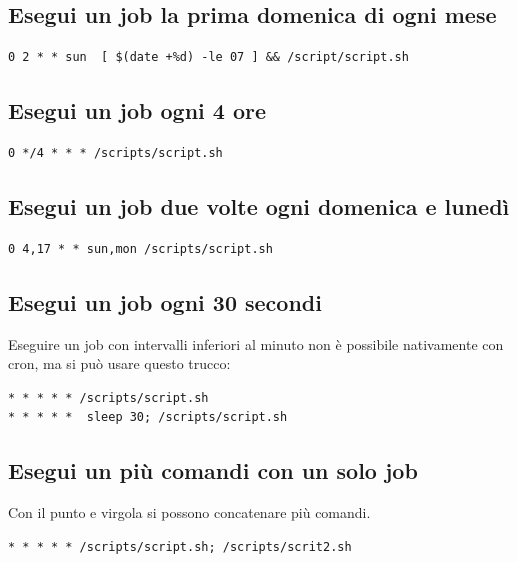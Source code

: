 \documentclass[a4paper]{report}
\newenvironment{code}{\begin{tcolorbox}[size=small]}{\end{tcolorbox}}
\begin{document}
\subsection{Esegui un job la prima domenica di ogni mese}
\begin{code}
	\begin{lstlisting}              
0 2 * * sun  [ $(date +%d) -le 07 ] && /script/script.sh
	\end{lstlisting}
\end{code}

\subsection{Esegui un job ogni 4 ore}
\begin{code}
	\begin{lstlisting}              
0 */4 * * * /scripts/script.sh
	\end{lstlisting}
\end{code}

\subsection{Esegui un job due volte ogni domenica e lunedì}
\begin{code}
	\begin{lstlisting}              
0 4,17 * * sun,mon /scripts/script.sh
	\end{lstlisting}
\end{code}

\subsection{Esegui un job ogni 30 secondi}
Eseguire un job con intervalli inferiori al minuto non è possibile nativamente con cron, ma si può usare questo trucco:
\begin{code}
	\begin{lstlisting}              
* * * * * /scripts/script.sh
* * * * *  sleep 30; /scripts/script.sh
	\end{lstlisting}
\end{code}

\subsection{Esegui un più comandi con un solo job}
Con il punto e virgola si possono concatenare più comandi.
\begin{code}
	\begin{lstlisting}              
* * * * * /scripts/script.sh; /scripts/scrit2.sh
	\end{lstlisting}
\end{code}
\end{document}

